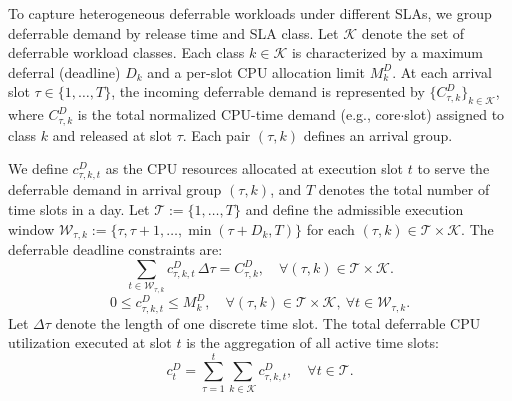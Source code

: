 \documentclass[a4paper,fleqn]{cas-dc}
\theoremstyle{plain}
\theoremstyle{remark}
\theoremstyle{plain}
\begin{document}
To capture heterogeneous deferrable workloads under different SLAs, we group deferrable demand by release time and SLA class.
Let $\mathcal{K}$ denote the set of deferrable workload classes. Each class $k\in\mathcal{K}$
is characterized by a maximum deferral (deadline) $D_k$ and a per-slot CPU allocation limit $M_k^D$.
At each arrival slot $\tau\in\{1,\ldots,T\}$, the incoming deferrable demand is represented by
$\{C_{\tau,k}^D\}_{k\in\mathcal{K}}$, where $C_{\tau,k}^D$ is the total normalized CPU-time demand (e.g., core$\cdot$slot)
assigned to class $k$ and released at slot $\tau$. Each pair $(\tau,k)$ defines an arrival group.

We define $c_{\tau,k,t}^D$ as the CPU resources allocated at execution slot $t$ to serve the deferrable demand
in arrival group $(\tau,k)$, and $T$ denotes the total number of time slots in a day. Let $\mathcal{T}:=\{1,\ldots,T\}$ and define the admissible execution window
$\mathcal{W}_{\tau,k}:=\{\tau,\tau+1,\ldots,\min(\tau+D_k,T)\}$ for each $(\tau,k)\in\mathcal{T}\times\mathcal{K}$.
The deferrable deadline constraints are:
\begin{equation}\label{eq:pd}
\sum_{t\in \mathcal{W}_{\tau,k}} c_{\tau,k,t}^D \,\Delta\tau = C_{\tau,k}^D,
\quad \forall (\tau,k)\in \mathcal{T}\times\mathcal{K}.
\end{equation}
\begin{equation}\label{eq:bounds}
0 \le c_{\tau,k,t}^D \le M_k^D,
\quad \forall (\tau,k)\in \mathcal{T}\times\mathcal{K},\ \forall t\in \mathcal{W}_{\tau,k}.
\end{equation}
Let $\Delta\tau$ denote the length of one discrete time slot. The total deferrable CPU utilization executed at slot $t$ is the aggregation of all active time slots:
\begin{equation}\label{eq:pd_agg}
c_t^D = \sum_{\tau=1}^{t}\sum_{k\in\mathcal{K}} c_{\tau,k,t}^D,\quad \forall t \in \mathcal{T}.
\end{equation}
\end{document}
